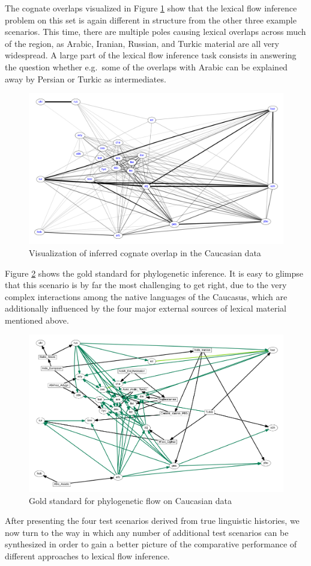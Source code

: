 The cognate overlaps visualized in Figure \ref{caucasus-cognacy} show that the lexical flow inference problem on this set is again different in structure from the other three example scenarios. This time, there are multiple poles causing lexical overlaps across much of the region, as Arabic, Iranian, Russian, and Turkic material are all very widespread. A large part of the lexical flow inference task consists in answering the question whether e.g.\ some of the overlaps with Arabic can be explained away by Persian or Turkic as intermediates.

\begin{figure}
 \includegraphics[width=\textwidth]{figures/cognacy-strength-caucasus.pdf}
 \caption{Visualization of inferred cognate overlap in the Caucasian data}
 \label{caucasus-cognacy}
\end{figure}

Figure \ref{caucasus-goldstandard-phylo} shows the gold standard for phylogenetic inference. It is easy to glimpse that this scenario is by far the most challenging to get right, due to the very complex interactions among the native languages of the Caucasus, which are additionally influenced by the four major external sources of lexical material mentioned above. 

\begin{figure}
  \includegraphics[width=\textwidth]{figures/goldstandard-phylo-caucasus.pdf}
  \caption{Gold standard for phylogenetic flow on Caucasian data} 
  \label{caucasus-goldstandard-phylo} 
\end{figure} 

After presenting the four test scenarios derived from true linguistic histories, we now turn to the way in which any number of additional test scenarios can be synthesized in order to gain a better picture of the comparative performance of different approaches to lexical flow inference.

